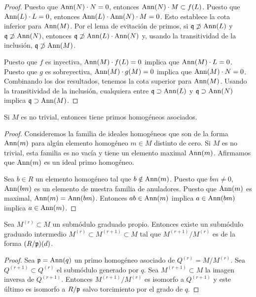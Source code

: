 \begin{proof}
Puesto que $\operatorname{Ann}(N) \cdot N = 0$, entonces $\operatorname{Ann}(N) \cdot M \subset f(L)$. Puesto que $\operatorname{Ann}(L) \cdot L = 0$, entonces $\operatorname{Ann}(L) \cdot \operatorname{Ann}(N) \cdot M = 0$. Esto establece la cota inferior para $\operatorname{Ann}(M)$. Por el lema de evitación de primos, si $\mathfrak q \not \supset \operatorname{Ann}(L)$ y $\mathfrak q \not \supset \operatorname{Ann}(N)$, entonces $\mathfrak q \not \supset \operatorname{Ann}(L) \cdot \operatorname{Ann}(N)$ y, usando la transitividad de la inclusión, $\mathfrak q \not \supset \operatorname{Ann}(M)$.

Puesto que $f$ es inyectiva, $\operatorname{Ann}(M) \cdot f(L) = 0$ implica que $\operatorname{Ann}(M) \cdot L = 0$. Puesto que $g$ es sobreyectiva, $\operatorname{Ann}(M) \cdot g(M) = 0$ implica que $\operatorname{Ann}(M) \cdot N = 0$. Combinando los dos resultados, tenemos la cota superior para $\operatorname{Ann}(M)$. Usando la transitividad de la inclusión, cualquiera entre $\mathfrak q \supset \operatorname{Ann}(L)$ y $\mathfrak q \supset \operatorname{Ann}(N)$ implica $\mathfrak q \supset \operatorname{Ann}(M)$.
\end{proof}

\begin{proposition}
Si $M$ es no trivial, entonces tiene primos homogéneos asociados.
\end{proposition}

\begin{proof}
Consideremos la familia de ideales homogéneos que son de la forma $\operatorname{Ann}(m)$ para algún elemento homogéneo $m \in M$ distinto de cero. Si $M$ es no trivial, esta familia es no vacía y tiene un elemento maximal $\operatorname{Ann}(m)$. Afirmamos que $\operatorname{Ann}(m)$ es un ideal primo homogéneo.

Sea $b \in R$ un elemento homogéneo tal que $b \notin \operatorname{Ann}(m)$. Puesto que $bm \ne 0$, $\operatorname{Ann}(bm)$ es un elemento de nuestra familia de anuladores. Puesto que $\operatorname{Ann}(m)$ es maximal, $\operatorname{Ann}(m) = \operatorname{Ann}(bm)$. Entonces $ab \in \operatorname{Ann}(m)$ implica $a \in \operatorname{Ann}(bm)$ implica $a \in \operatorname{Ann}(m)$.
\end{proof}

\begin{proposition}
Sea $M^{(r)} \subset M$ un submódulo graduado propio. Entonces existe un submódulo graduado intermedio $M^{(r)} \subset M^{(r+1)} \subset M$ tal que $M^{(r+1)} / M^{(r)}$ es de la forma $(R/\mathfrak p)(d)$.
\end{proposition}

\begin{proof}
Sea $\mathfrak p = \operatorname{Ann}(q)$ un primo homogéneo asociado de $Q^{(r)} = M/M^{(r)}$. Sea $Q^{(r+1)} \subset Q^{(r)}$ el submódulo generado por $q$. Sea $M^{(r+1)} \subset M$ la imagen inversa de $Q^{(r+1)}$. Entonces $M^{(r+1)} / M^{(r)}$ es isomorfo a $Q^{(r+1)}$ y este último es isomorfo a $R/\mathfrak p$ salvo torcimiento por el grado de $q$.
\end{proof}

